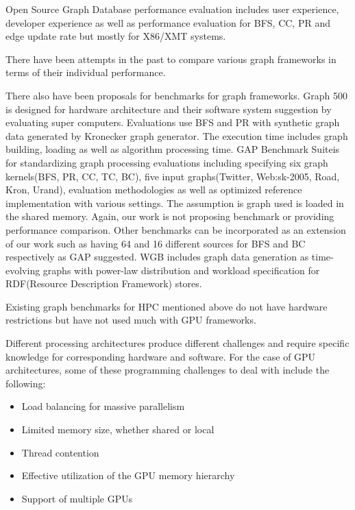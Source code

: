 Open Source Graph Database performance evaluation\cite{mccoll2014performance} includes user experience, developer experience as well as performance evaluation for BFS, CC, PR and edge update rate but mostly for X86/XMT systems.

There have been attempts in the past to compare various graph frameworks in terms of their individual performance.

There also have been proposals for benchmarks for graph frameworks.
Graph 500 is designed for hardware architecture and their software system suggestion by evaluating super computers. Evaluations use BFS and PR with synthetic graph data generated by Kronecker graph generator\cite{Leskovec:2010:KGA:1756006.1756039}. The execution time includes graph building, loading as well as algorithm processing time.
GAP Benchmark Suite\cite{DBLP:journals/corr/BeamerAP15}is for standardizing graph processing evaluations including specifying six graph kernels(BFS, PR, CC, TC, BC), five input graphs(Twitter, Web:sk-2005, Road, Kron, Urand), evaluation methodologies as well as optimized reference implementation with various settings. The assumption is graph used is loaded in the shared memory.
Again, our work is not proposing benchmark or providing performance comparison. Other benchmarks can be incorporated as an extension of our work such as having 64 and 16 different sources for BFS and BC respectively as GAP suggested. %
WGB\cite{Ammar2013WGBTA} includes graph data generation as time-evolving graphs with power-law distribution and workload specification for RDF(Resource Description Framework) stores.

Existing graph benchmarks for HPC mentioned above do not have hardware restrictions but have not used much with GPU frameworks.

Different processing architectures produce different challenges and require specific knowledge for corresponding hardware and software. For the case of GPU architectures, some of these programming challenges to deal with include the following:
\begin{itemize}
    \item Load balancing for massive parallelism
    \item Limited memory size, whether shared or local
    \item Thread contention
    \item Effective utilization of the GPU memory hierarchy
    \item Support of multiple GPUs
\end{itemize}


